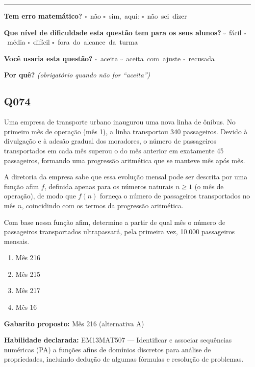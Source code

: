 \documentclass[11pt,a4paper]{article}
\begin{document}
\noindent\rule{\linewidth}{0.4pt}
\textbf{Tem erro matemático?}\quad
\mbox{$\square$~não} \quad \mbox{$\square$~sim, aqui:} \underline{\hspace{5cm}}
\quad \mbox{$\square$~não sei dizer}

\textbf{Que nível de dificuldade esta questão tem para os seus alunos?}\quad
\mbox{$\square$~fácil} \quad \mbox{$\square$~média} \quad
\mbox{$\square$~difícil} \quad \mbox{$\square$~fora do alcance da turma}

\textbf{Você usaria esta questão?}\quad
\mbox{$\square$~aceita} \quad \mbox{$\square$~aceita com ajuste} \quad
\mbox{$\square$~recusada}

\textbf{Por quê?} \emph{(obrigatório quando não for ``aceita'')}

\underline{\hspace{\linewidth}}

\underline{\hspace{\linewidth}}
\vspace{0.6em}

\begin{samepage}
\subsection*{Q074}
Uma empresa de transporte urbano inaugurou uma nova linha de ônibus. No primeiro mês de operação (mês 1), a linha transportou 340 passageiros. Devido à divulgação e à adesão gradual dos moradores, o número de passageiros transportados em cada mês superou o do mês anterior em exatamente 45 passageiros, formando uma progressão aritmética que se manteve mês após mês.

A diretoria da empresa sabe que essa evolução mensal pode ser descrita por uma função afim $f$, definida apenas para os números naturais $n \geq 1$ (o mês de operação), de modo que $f(n)$ forneça o número de passageiros transportados no mês $n$, coincidindo com os termos da progressão aritmética.

Com base nessa função afim, determine a partir de qual mês o número de passageiros transportados ultrapassará, pela primeira vez, 10.000 passageiros mensais.
\begin{enumerate}[label=(\alph*),nosep,leftmargin=*]
\item Mês 216
\item Mês 215
\item Mês 217
\item Mês 16
\end{enumerate}

\textbf{Gabarito proposto:} Mês 216 (alternativa A)

\textbf{Habilidade declarada:} EM13MAT507 --- Identificar e associar sequências numéricas (PA) a funções afins de domínios discretos para análise de propriedades, incluindo dedução de algumas fórmulas e resolução de problemas.
\end{samepage}
\end{document}
